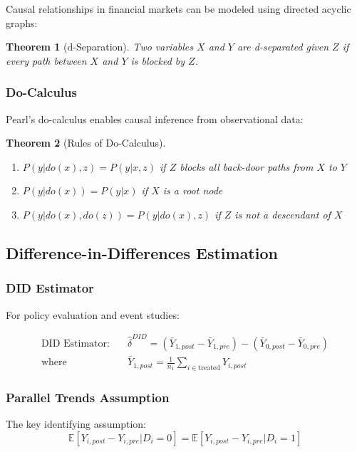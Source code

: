 \documentclass[11pt,letterpaper,openany]{book}
\newtheorem{theorem}{Theorem}[chapter]
\begin{document}
Causal relationships in financial markets can be modeled using directed acyclic graphs:

\begin{theorem}[d-Separation]
Two variables $X$ and $Y$ are d-separated given $Z$ if every path between $X$ and $Y$ is blocked by $Z$.
\end{theorem}

\subsubsection{Do-Calculus}

Pearl's do-calculus enables causal inference from observational data:

\begin{theorem}[Rules of Do-Calculus]
\begin{enumerate}
\item $P(y|do(x), z) = P(y|x, z)$ if $Z$ blocks all back-door paths from $X$ to $Y$
\item $P(y|do(x)) = P(y|x)$ if $X$ is a root node
\item $P(y|do(x), do(z)) = P(y|do(x), z)$ if $Z$ is not a descendant of $X$
\end{enumerate}
\end{theorem}

\subsection{Difference-in-Differences Estimation}

\subsubsection{DID Estimator}

For policy evaluation and event studies:

\begin{align}
\text{DID Estimator:} \quad & \hat{\delta}^{DID} = (\bar{Y}_{1,post} - \bar{Y}_{1,pre}) - (\bar{Y}_{0,post} - \bar{Y}_{0,pre}) \\
\text{where} \quad & \bar{Y}_{1,post} = \frac{1}{n_1} \sum_{i \in \text{treated}} Y_{i,post}
\end{align}

\subsubsection{Parallel Trends Assumption}

The key identifying assumption:
\[
\mathbb{E}[Y_{i,post} - Y_{i,pre} | D_i = 0] = \mathbb{E}[Y_{i,post} - Y_{i,pre} | D_i = 1]
\]
\end{document}
